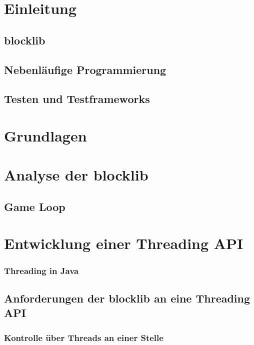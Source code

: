 \documentclass[12pt,a4paper,listof=totocnumbered,parskip=half]{scrreprt}
\begin{document}

\null\thispagestyle{empty}\clearpage
\tableofcontents
\chapter{Einleitung}
\section{blocklib}
\section{Nebenläufige Programmierung}
\section{Testen und Testframeworks}

\chapter{Grundlagen}



\chapter{Analyse der blocklib}

\section{Game Loop}



\chapter{Entwicklung einer Threading API}


\subsection{Threading in Java}

\section{Anforderungen der blocklib an eine Threading API}
\subsection{Kontrolle über Threads an einer Stelle}

\end{document}
